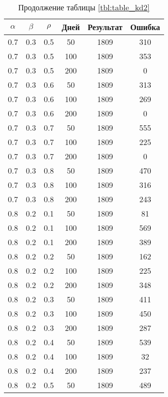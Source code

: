 \begin{table}[h]
	\begin{center}
        \captionsetup{justification=raggedright,singlelinecheck=off}
		\caption*{Продолжение таблицы \ref{tbl:table_kd2}}
		\begin{tabular}{|c|c|c|c|c|c|}
  	\hline
	$\alpha$ & $\beta$ & $\rho$ & Дней & Результат & Ошибка \\\hline
		0.7 &  0.3 &  0.5 &   50 &  1809 &   310 \\
		0.7 &  0.3 &  0.5 &  100 &  1809 &   353 \\
		0.7 &  0.3 &  0.5 &  200 &  1809 &     0 \\
	   \hline
		0.7 &  0.3 &  0.6 &   50 &  1809 &   313 \\
		0.7 &  0.3 &  0.6 &  100 &  1809 &   269 \\
		0.7 &  0.3 &  0.6 &  200 &  1809 &     0 \\
	   \hline
		0.7 &  0.3 &  0.7 &   50 &  1809 &   555 \\
		0.7 &  0.3 &  0.7 &  100 &  1809 &   225 \\
		0.7 &  0.3 &  0.7 &  200 &  1809 &     0 \\
	   \hline
		0.7 &  0.3 &  0.8 &   50 &  1809 &   470 \\
		0.7 &  0.3 &  0.8 &  100 &  1809 &   316 \\
		0.7 &  0.3 &  0.8 &  200 &  1809 &   243 \\
	   \hline
		0.8 &  0.2 &  0.1 &   50 &  1809 &    81 \\
		0.8 &  0.2 &  0.1 &  100 &  1809 &   569 \\
		0.8 &  0.2 &  0.1 &  200 &  1809 &   389 \\
	   \hline
		0.8 &  0.2 &  0.2 &   50 &  1809 &   162 \\
		0.8 &  0.2 &  0.2 &  100 &  1809 &   225 \\
		0.8 &  0.2 &  0.2 &  200 &  1809 &   348 \\
	   \hline
		0.8 &  0.2 &  0.3 &   50 &  1809 &   411 \\
		0.8 &  0.2 &  0.3 &  100 &  1809 &   450 \\
		0.8 &  0.2 &  0.3 &  200 &  1809 &   287 \\
	   \hline
		0.8 &  0.2 &  0.4 &   50 &  1809 &   539 \\
		0.8 &  0.2 &  0.4 &  100 &  1809 &    32 \\
		0.8 &  0.2 &  0.4 &  200 &  1809 &   237 \\
	   \hline
		0.8 &  0.2 &  0.5 &   50 &  1809 &   489 \\

\end{tabular}
\end{center}
\end{table}
